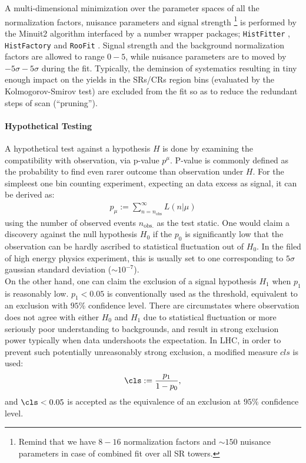 A multi-dimensional minimization over the parameter spaces of all the normalization factors, nuisance parameters and signal strength 
\footnote{Remind that we have $8-16$ normalization factors and $\sim 150$ nuisance parameters in case of combined fit over all SR towers.}
is performed by the Minuit2 algorithm \cite{Minuite2} interfaced by a number wrapper packages; \texttt{HistFitter} \cite{HistFitter}, \texttt{HistFactory} \cite{HistFactory} and \texttt{RooFit} \cite{RooFit}.
Signal strength and the background normalization factors are allowed to range $0-5$, while nuisance parameters are to moved by $-5\sigma - 5\sigma$ during the fit. Typically, the deminsion of systematics resulting in tiny enough impact on the yields in the SRs/CRs region bins (evaluated by the Kolmogorov-Smirov test) are excluded from the fit so as to reduce the redundant steps of scan (``pruning'').


\paragraph{Hypothetical Testing}
A hypothetical test against a hypothesis $H$ is done by examining the compatibility with observation, via p-value $p^\mu$.
P-value is commonly defined as the probability to find even rarer outcome than observation under $H$. 
For the simpleest one bin counting experiment, expecting an data excess as signal, it can be derived as:
\begin{align}
p_\mu := \sum_{n=n_{\mathrm{obs}}}^{\infty} L(n|\mu) 
\end{align}
using the number of observed events $n_{\mathrm{obs.}}$ as the test static.
One would claim a discovery against the null hypothesis $H_0$ if the $p_0$ is significantly low that the observation can be hardly ascribed to statistical fluctuation out of $H_0$. In the filed of high energy physics experiment, this is usually set to one corresponding to $5\sigma$ gaussian standard deviation ($\sim 10^{-7}$). \\

On the other hand, one can claim the exclusion of a signal hypothesis $H_1$ when $p_1$ is reasonably low. $p_1<0.05$ is conventionally used as the threshold, equivalent to an exclusion with $95\%$ confidence level. There are circumstates where observation does not agree with either $H_0$ and $H_1$ due to statistical fluctuation or more seriously poor understanding to backgrounds, and result in strong exclusion power typically when data undershoots the expectation. In LHC, in order to prevent such potentially unreasonably strong exclusion, a modified measure $cls$ is used:
\begin{align}
\cls := \frac{p_1}{1-p_0},
\end{align}
and $\cls<0.05$ is accepted as the equivalence of an exclusion at $95\%$ confidence level. \\

